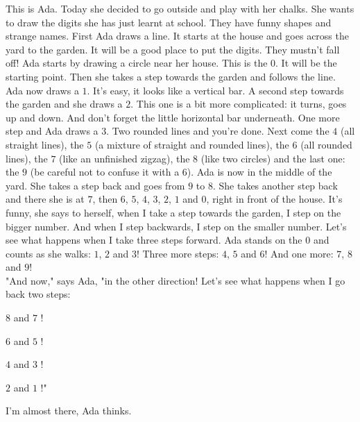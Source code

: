 This is Ada. Today she decided to go outside and play with her chalks. 
She wants to draw the digits she has just learnt at school. They have funny shapes and strange names.
First Ada draws a line. It starts at the house and goes across the yard to the garden. 
It will be a good place to put the digits. They mustn't fall off! 
Ada starts by drawing a circle near her house. This is the $0$. It will be the starting point. 
Then she takes a step towards the garden and follows the line. Ada now draws a $1$. It's easy, it looks like a vertical bar. 
A second step towards the garden and she draws a $2$. This one is a bit more complicated: it turns, goes up and down. And don't forget the little horizontal bar underneath.
One more step and Ada draws a $3$. Two rounded lines and you're done.
Next come the $4$ (all straight lines), the $5$ (a mixture of straight and rounded lines), the $6$ (all rounded lines), the $7$ (like an unfinished zigzag), the $8$ (like two circles) and the last one: the $9$ (be careful not to confuse it with a $6$).  
Ada is now in the middle of the yard. She takes a step back and goes from $9$ to $8$. She takes another step back and there she is at $7$, then $6$, $5$, $4$, $3$, $2$, $1$ and $0$, right in front of the house. 
It's funny, she says to herself, when I take a step towards the garden, I step on the bigger number. And when I step backwards, I step on the smaller number. 
Let's see what happens when I take three steps forward.
Ada stands on the $0$ and counts as she walks: $1$, $2$ and $3$! Three more steps: $4$, $5$ and $6$! And one more: $7$, $8$ and $9$! \\
"And now," says Ada, "in the other direction! Let's see what happens when I go back two steps: 
\begin{description}
    \item $8$ and $7$ ! 
    \item $6$ and $5$ ! 
    \item $4$ and $3$ ! 
    \item $2$ and $1$ !"
\end{description} 
I'm almost there, Ada thinks.